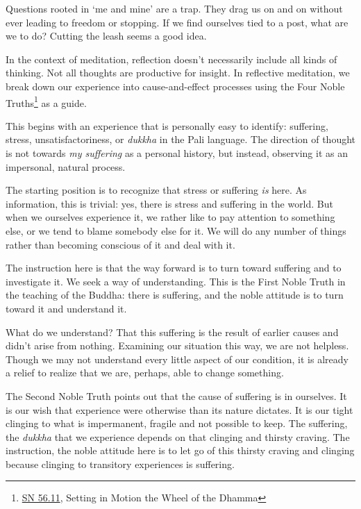 Questions rooted in `me and mine' are a trap. They drag us on and on
without ever leading to freedom or stopping. If we find ourselves tied
to a post, what are we to do? Cutting the leash seems a good idea.

In the context of meditation, reflection doesn't necessarily include all
kinds of thinking. Not all thoughts are productive for insight. In
reflective meditation, we break down our experience into
cause-and-effect processes using the Four Noble Truths\footnote{\href{https://suttacentral.net/sn56.11}{SN
  56.11}, Setting in Motion the Wheel of the Dhamma} as a guide.

This begins with an experience that is personally easy to identify:
suffering, stress, unsatisfactoriness, or \emph{dukkha} in the Pali
language. The direction of thought is not towards \emph{my suffering} as
a personal history, but instead, observing it as an impersonal, natural
process.


The starting position is to recognize that stress or suffering \emph{is}
here. As information, this is trivial: yes, there is stress and
suffering in the world. But when we ourselves experience it, we rather
like to pay attention to something else, or we tend to blame somebody
else for it. We will do any number of things rather than becoming
conscious of it and deal with it.

The instruction here is that the way forward is to turn toward suffering
and to investigate it. We seek a way of understanding. This is the First
Noble Truth in the teaching of the Buddha: there is suffering, and the
noble attitude is to turn toward it and understand it.

What do we understand? That this suffering is the result of earlier
causes and didn't arise from nothing. Examining our situation this way,
we are not helpless. Though we may not understand every little aspect of
our condition, it is already a relief to realize that we are, perhaps,
able to change something.

\clearpage

\vspace*{-\baselineskip}


The Second Noble Truth points out that the cause of suffering is in
ourselves. It is our wish that experience were otherwise than its nature
dictates. It is our tight clinging to what is impermanent, fragile and
not possible to keep. The suffering, the \emph{dukkha} that we
experience depends on that clinging and thirsty craving. The
instruction, the noble attitude here is to let go of this thirsty
craving and clinging because clinging to transitory experiences is
suffering.

